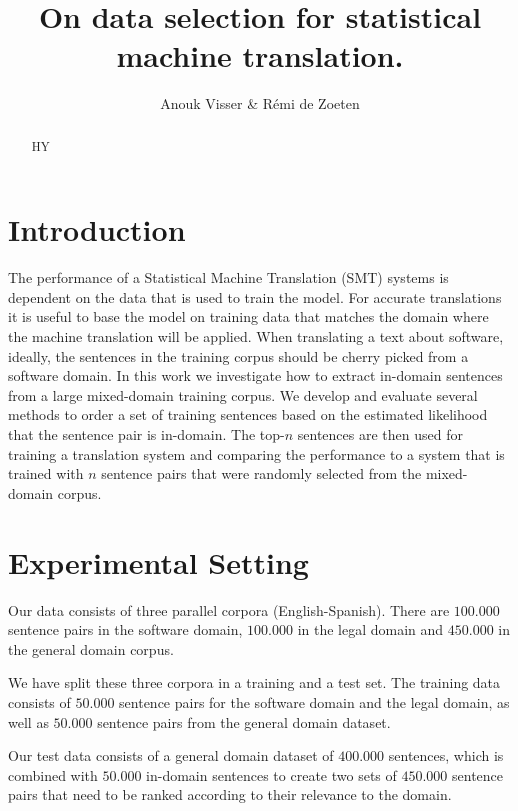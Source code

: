 \documentclass[11pt]{article}
\title{On data selection for statistical machine translation.}
\author{Anouk Visser \& R\'emi de Zoeten}
\date{}
\begin{document}
\maketitle

\begin{abstract}
HY
\end{abstract}

\section{Introduction}
\label{sec:intro}
The performance of a Statistical Machine Translation (SMT) systems is dependent on the data that is used to train the model. For accurate translations it is useful to base the model on training data that matches the domain where the machine translation will be applied. When translating a text about software, ideally, the sentences in the training corpus should be cherry picked from a software domain. 
In this work we investigate how to extract in-domain sentences from a large mixed-domain training corpus. We develop and evaluate several methods to order a set of training sentences based on the estimated likelihood that the sentence pair is in-domain. The top-$n$ sentences are then used for training a translation system and comparing the performance to a system that is trained with $n$ sentence pairs that were randomly selected from the mixed-domain corpus.

\section{Experimental Setting}
Our data consists of three parallel corpora (English-Spanish). There are $100.000$ sentence pairs in the software domain, $100.000$ in the legal domain and $450.000$ in the general domain corpus. 

We have split these three corpora in a training and a test set. The training data consists of $50.000$ sentence pairs for the software domain and the legal domain, as well as $50.000$ sentence pairs from the general domain dataset.

Our test data consists of a general domain dataset of $400.000$ sentences, which is combined with $50.000$ in-domain sentences to create two sets of $450.000$ sentence pairs that need to be ranked according to their relevance to the domain.
\end{document}

